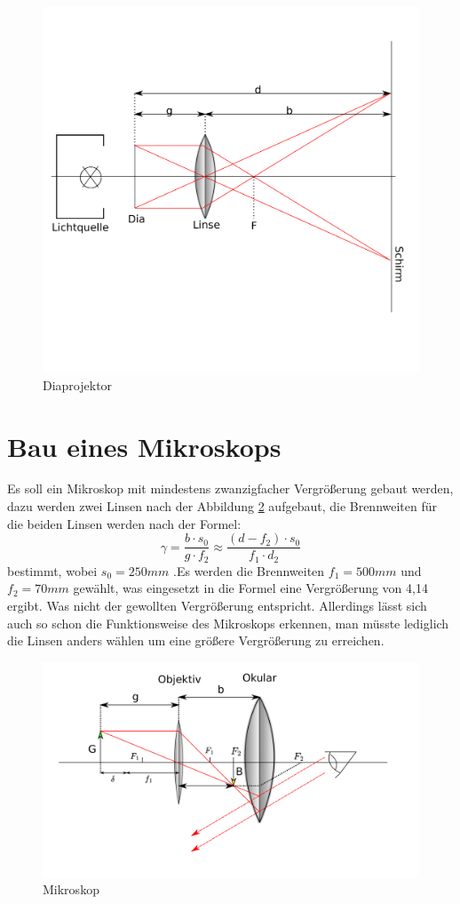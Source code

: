 \begin{figure}
    \centering
    \includegraphics[scale=0.8]{Geometrische_Optik/Protokoll/fig/Diaprojektor.png}
    \caption{Diaprojektor}
    \label{fig:Diaprojektor}
\end{figure}

\section{Bau eines Mikroskops}
Es soll ein Mikroskop mit mindestens zwanzigfacher Vergrößerung gebaut werden, dazu werden zwei Linsen nach der Abbildung \ref{fig:Mikroskop} aufgebaut, die Brennweiten für die beiden Linsen werden nach der Formel: $$ \gamma = \frac{b \cdot s_0}{g \cdot f_2 } \approx \frac{(d - f_2) \cdot s_0}{f_1 \cdot d_2}$$ bestimmt, wobei $s_0 = 250mm$ .Es werden die Brennweiten $f_1 = 500mm$ und $f_2 = 70mm$ gewählt, was eingesetzt in die Formel eine Vergrößerung von 4,14 ergibt. Was nicht der gewollten Vergrößerung entspricht. Allerdings lässt sich auch so schon die Funktionsweise des Mikroskops erkennen, man müsste lediglich die Linsen anders wählen um eine größere Vergrößerung zu erreichen.

\begin{figure}
    \centering
    \includegraphics[scale=0.8]{Geometrische_Optik/Protokoll/fig/Mikroskop.png}
    \caption{Mikroskop}
    \label{fig:Mikroskop}
\end{figure}